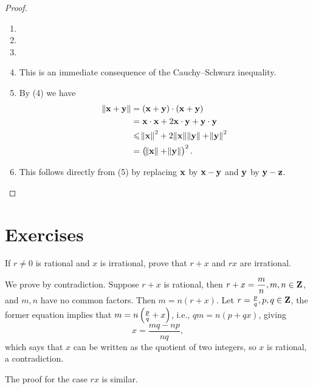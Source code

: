 \begin{proof} \
\begin{enumerate}[label=(\arabic*)]
\item 
\item 
\item 
\item This is an immediate consequence of the Cauchy--Schwarz inequality.
\item By (4) we have
\begin{align*}
\norm{\vb{x}+\vb{y}}&=(\vb{x}+\vb{y})\cdot(\vb{x}+\vb{y})\\
&=\vb{x}\cdot\vb{x}+2\vb{x}\cdot\vb{y}+\vb{y}\cdot\vb{y}\\
&\leqslant\norm{\vb{x}}^2+2\norm{\vb{x}}\norm{\vb{y}}+\norm{\vb{y}}^2\\
&=\left(\norm{\vb{x}}+\norm{\vb{y}}\right)^2.
\end{align*}
\item This follows directly from (5) by replacing $\vb{x}$ by $\vb{x}-\vb{y}$ and $\vb{y}$ by $\vb{y}-\vb{z}$.
\end{enumerate}
\end{proof}

\begin{comment}
\begin{definition}
The \vocab{distance between sets} $E\subset\RR^n$ and $F\subset\RR^n$ is defined as
\[ d(E,F)\coloneqq\inf_{x\in E,y\in F}\norm{x-y}. \]
\end{definition}

Obviously $d(E,F)>0$ implies that $E$ and $F$ are disjoint, but $E$ and $F$ may still be disjoint even if $d(E,F)=0$. For example, the closed intervals $E=(-1,0)$ and $F=(0,1)$.

\begin{exercise}
Suppose that $E$ and $F$ are sets in $\RR^n$ where $E$ and $F$ is finite. Prove that $E$ and $F$ are disjoint if and only if $d(E,F)>0$.
\end{exercise}
\end{comment}
\pagebreak

\section*{Exercises}
\begin{prbm}
If $r\neq0$ is rational and $x$ is irrational, prove that $r+x$ and $rx$ are irrational.
\end{prbm}

\begin{solution}
We prove by contradiction. Suppose $r+x$ is rational, then $r+x=\dfrac{m}{n},m,n\in\mathbf Z$, and $m,n$ have no common factors. Then $m=n(r+x)$. Let $r=\frac{p}{q},p,q\in\mathbf Z$, the former equation implies that $m=n\left(\frac{p}{q}+x\right)$, i.e., $qm=n(p+qx)$, giving
\[x=\frac{mq-np}{nq},\]
which says that $x$ can be written as the quotient of two integers, so $x$ is rational, a contradiction.

The proof for the case $rx$ is similar.
\end{solution}


